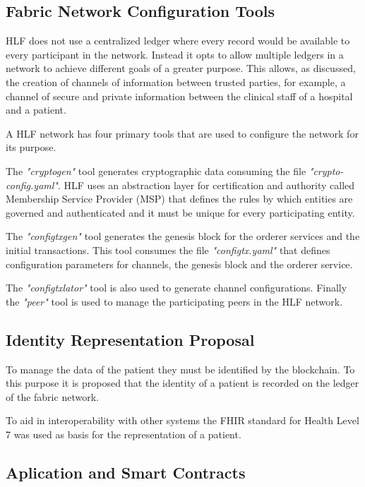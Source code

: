 \documentclass[]{llncs}
\begin{document}
\subsection{Fabric Network Configuration Tools}

HLF does not use a centralized ledger where every record would be available to every 
participant in the network. 
Instead it opts to allow multiple ledgers in a network to achieve different goals of a greater purpose. 
This allows, as discussed, the creation of channels of information between trusted parties, 
for example, a channel of secure and private information between the clinical staff of a hospital and a patient.

A HLF network has four primary tools that are used to configure the network for its purpose.

The \textit{"cryptogen"} tool generates cryptographic data consuming the file \textit{"crypto-config.yaml"}. 
HLF uses an abstraction layer for certification and authority called Membership Service Provider (MSP) 
that defines the rules by which entities are governed and authenticated and 
it must be unique for every participating entity.

The \textit{"configtxgen"} tool generates the genesis block for the orderer services and the initial transactions. 
This tool consumes the file \textit{"configtx.yaml"} that defines configuration parameters 
for channels, the genesis block and the orderer service.

The \textit{"configtxlator"} tool is also used to generate channel configurations. 
Finally the \textit{"peer"} tool is used to manage the participating peers in the HLF network.

\subsection{Identity Representation Proposal}

To manage the data of the patient they must be identified by the blockchain. 
To this purpose it is proposed that the identity of a patient is recorded on the 
ledger of the fabric network.

To aid in interoperability with other systems the FHIR standard for Health Level 7 
was used as basis for the representation of a patient.

\subsection{Aplication and Smart Contracts}
\end{document}
